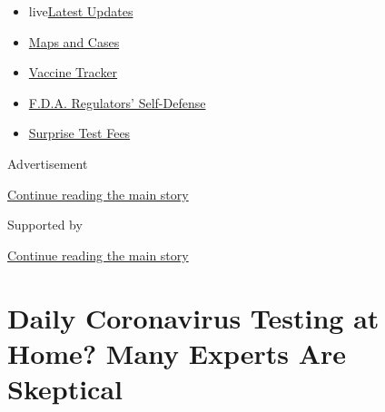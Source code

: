 \begin{itemize}
\tightlist
\item
  live\href{https://www.nytimes3xbfgragh.onion/2020/09/11/world/covid-19-coronavirus.html?name=styln-coronavirus-national\&region=TOP_BANNER\&block=storyline_menu_recirc\&action=click\&pgtype=Article\&impression_id=acf11f51-f4b6-11ea-bb95-3783730020e3\&variant=undefined}{Latest
  Updates}
\item
  \href{https://www.nytimes3xbfgragh.onion/interactive/2020/us/coronavirus-us-cases.html?name=styln-coronavirus-national\&region=TOP_BANNER\&block=storyline_menu_recirc\&action=click\&pgtype=Article\&impression_id=acf14660-f4b6-11ea-bb95-3783730020e3\&variant=undefined}{Maps
  and Cases}
\item
  \href{https://www.nytimes3xbfgragh.onion/interactive/2020/science/coronavirus-vaccine-tracker.html?name=styln-coronavirus-national\&region=TOP_BANNER\&block=storyline_menu_recirc\&action=click\&pgtype=Article\&impression_id=acf14661-f4b6-11ea-bb95-3783730020e3\&variant=undefined}{Vaccine
  Tracker}
\item
  \href{https://www.nytimes3xbfgragh.onion/2020/09/10/us/politics/fda-coronavirus-vaccine.html?name=styln-coronavirus-national\&region=TOP_BANNER\&block=storyline_menu_recirc\&action=click\&pgtype=Article\&impression_id=acf14662-f4b6-11ea-bb95-3783730020e3\&variant=undefined}{F.D.A.
  Regulators' Self-Defense}
\item
  \href{https://www.nytimes3xbfgragh.onion/2020/09/09/upshot/coronavirus-surprise-test-fees.html?name=styln-coronavirus-national\&region=TOP_BANNER\&block=storyline_menu_recirc\&action=click\&pgtype=Article\&impression_id=acf14663-f4b6-11ea-bb95-3783730020e3\&variant=undefined}{Surprise
  Test Fees}
\end{itemize}

Advertisement

\protect\hyperlink{after-top}{Continue reading the main story}

Supported by

\protect\hyperlink{after-sponsor}{Continue reading the main story}

\hypertarget{daily-coronavirus-testing-at-home-many-experts-are-skeptical}{%
\section{Daily Coronavirus Testing at Home? Many Experts Are
Skeptical}\label{daily-coronavirus-testing-at-home-many-experts-are-skeptical}}

